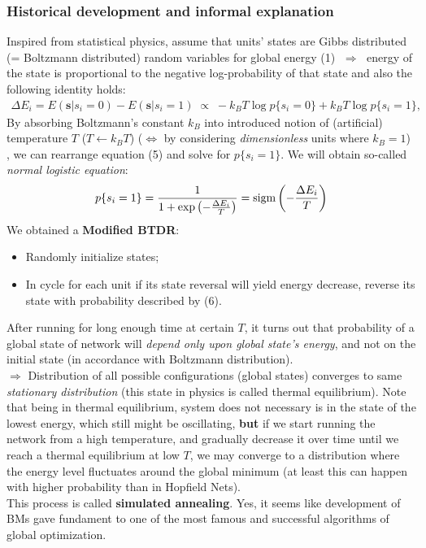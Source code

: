 \subsubsection{Historical development and informal explanation}
Inspired from statistical physics, assume that units' states are Gibbs distributed (= Boltzmann distributed) random variables for global energy (1) $\;\Rightarrow\;$ energy of the state is proportional to the negative log-probability of that state and also the following identity holds:
\begin{gather}
\Delta E_i = E(\mathbf{s}|s_i=0) - E(\mathbf{s}|s_i=1) \;\propto\; -k_BT\log p\{s_i=0\}+k_BT\log p\{s_i=1\},
\end{gather}
By absorbing Boltzmann's constant $k_B$ into introduced notion of (artificial) temperature $T$ ($T\leftarrow k_BT$) ($\Leftrightarrow$ by considering \emph{dimensionless} units where $k_B=1$) , we can rearrange equation (5) and solve for $ p\{s_i=1\}$. We will obtain so-called \emph{normal logistic equation}:
\begin{gather}
 p\{s_i=1\}=\frac{1}{1+\exp\left(-\frac{\Delta E_i}{T}\right)}=\text{sigm}\left(-\frac{\Delta E_i}{T}\right)
\end{gather} 
We obtained a \textbf{Modified BTDR}:
\begin{itemize}
\item Randomly initialize states;
\item In cycle for each unit if its state reversal will yield energy decrease, reverse its state with probability described by (6).
\end{itemize}
After running for long enough time at certain $T$, it turns out that probability of a global state of network will \emph{depend only upon global state's energy}, and not on the initial state (in accordance with Boltzmann distribution). 
\\$\Rightarrow$ Distribution of all possible configurations (global states) converges to same \emph{stationary distribution} (this state in physics is called thermal equilibrium). Note that being in thermal equilibrium, system does not necessary is in the state of the lowest energy, which still might be oscillating, \textbf{but} if we start running the network from a high temperature, and gradually decrease it over time until we reach a thermal equilibrium at low $T$, we may converge to a distribution where the energy level fluctuates around the global minimum (at least this can happen with higher probability than in Hopfield Nets). 
\\This process is called \textbf{simulated annealing}. Yes, it seems like development of BMs gave fundament to one of the most famous and successful algorithms of global optimization.
